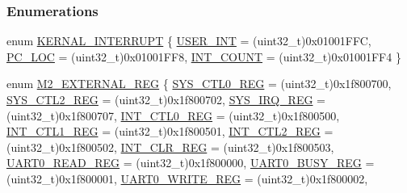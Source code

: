 \subsubsection*{Enumerations}
\begin{DoxyCompactItemize}
\item 
enum \mbox{\hyperlink{a00020_a4ecccde27f29cedbe9bc6a22e3aad16f}{K\+E\+R\+N\+A\+L\+\_\+\+I\+N\+T\+E\+R\+R\+U\+PT}} \{ \mbox{\hyperlink{a00020_a4ecccde27f29cedbe9bc6a22e3aad16fa2c882d4b03fdd083b40f2807ea7c0bf2}{U\+S\+E\+R\+\_\+\+I\+NT}} = (uint32\+\_\+t)0x01001\+F\+FC, 
\mbox{\hyperlink{a00020_a4ecccde27f29cedbe9bc6a22e3aad16fa2a5bd1194e8dba9ee7ed1d1039942739}{P\+C\+\_\+\+L\+OC}} = (uint32\+\_\+t)0x01001\+F\+F8, 
\mbox{\hyperlink{a00020_a4ecccde27f29cedbe9bc6a22e3aad16fa529ec3035e124aebce1fd8b0a0b7c408}{I\+N\+T\+\_\+\+C\+O\+U\+NT}} = (uint32\+\_\+t)0x01001\+F\+F4
 \}
\item 
enum \mbox{\hyperlink{a00020_adadaa0ab1ebbd7ba9b70dfd24c3ed44d}{M2\+\_\+\+E\+X\+T\+E\+R\+N\+A\+L\+\_\+\+R\+EG}} \{ \newline
\mbox{\hyperlink{a00020_adadaa0ab1ebbd7ba9b70dfd24c3ed44dab61d9968d782d6c00e9de838e38913f5}{S\+Y\+S\+\_\+\+C\+T\+L0\+\_\+\+R\+EG}} = (uint32\+\_\+t)0x1f800700, 
\mbox{\hyperlink{a00020_adadaa0ab1ebbd7ba9b70dfd24c3ed44da7dd70f67b5962a7974603376399afb49}{S\+Y\+S\+\_\+\+C\+T\+L2\+\_\+\+R\+EG}} = (uint32\+\_\+t)0x1f800702, 
\mbox{\hyperlink{a00020_adadaa0ab1ebbd7ba9b70dfd24c3ed44da9c4ce03a199984a23165617318767eca}{S\+Y\+S\+\_\+\+I\+R\+Q\+\_\+\+R\+EG}} = (uint32\+\_\+t)0x1f800707, 
\mbox{\hyperlink{a00020_adadaa0ab1ebbd7ba9b70dfd24c3ed44da417bb62509b1343f4685a023c8ec4b09}{I\+N\+T\+\_\+\+C\+T\+L0\+\_\+\+R\+EG}} = (uint32\+\_\+t)0x1f800500, 
\mbox{\hyperlink{a00020_adadaa0ab1ebbd7ba9b70dfd24c3ed44dabc5f0d33bb47527f3d8a9c20250d5c5b}{I\+N\+T\+\_\+\+C\+T\+L1\+\_\+\+R\+EG}} = (uint32\+\_\+t)0x1f800501, 
\mbox{\hyperlink{a00020_adadaa0ab1ebbd7ba9b70dfd24c3ed44dafba45e74edabe7b9fd6d0c36e8492bcd}{I\+N\+T\+\_\+\+C\+T\+L2\+\_\+\+R\+EG}} = (uint32\+\_\+t)0x1f800502, 
\mbox{\hyperlink{a00020_adadaa0ab1ebbd7ba9b70dfd24c3ed44da33cabaff7369092ec0e29dd2ffb0cb3d}{I\+N\+T\+\_\+\+C\+L\+R\+\_\+\+R\+EG}} = (uint32\+\_\+t)0x1f800503, 
\mbox{\hyperlink{a00020_adadaa0ab1ebbd7ba9b70dfd24c3ed44da744e0b80c93cc5242d28ebff68af035c}{U\+A\+R\+T0\+\_\+\+R\+E\+A\+D\+\_\+\+R\+EG}} = (uint32\+\_\+t)0x1f800000, 
\mbox{\hyperlink{a00020_adadaa0ab1ebbd7ba9b70dfd24c3ed44daf27c578db5f1c598bc68d35594c46c3b}{U\+A\+R\+T0\+\_\+\+B\+U\+S\+Y\+\_\+\+R\+EG}} = (uint32\+\_\+t)0x1f800001, 
\mbox{\hyperlink{a00020_adadaa0ab1ebbd7ba9b70dfd24c3ed44daa28fa5d3d15be1e18c88f0a9b49ae354}{U\+A\+R\+T0\+\_\+\+W\+R\+I\+T\+E\+\_\+\+R\+EG}} = (uint32\+\_\+t)0x1f800002, 

\end{DoxyCompactItemize}
